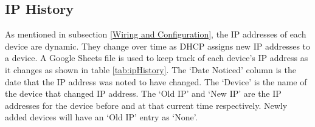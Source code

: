 \begin{table}[H]
    \centering
    \caption{Device inventory excerpt. Password column not shown.}
    \label{tab:deviceInventory}
\end{table}

\subsection{IP History}
\label{IP History}
As mentioned in subsection \ref{Wiring and Configuration}, the IP addresses of each device are dynamic. They change over time as DHCP assigns new IP addresses to a device. A Google Sheets file is used to keep track of each device's IP address as it changes as shown in table \ref{tab:ipHistory}. The `Date Noticed' column is the date that the IP address was noted to have changed. The `Device' is the name of the device that changed IP address. The `Old IP' and `New IP' are the IP addresses for the device before and at that current time respectively. Newly added devices will have an `Old IP' entry as `None'.

